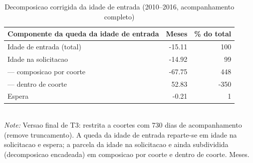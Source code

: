 \begin{table}[htbp]\centering
\caption{Decomposicao corrigida da idade de entrada (2010--2016, acompanhamento completo)}
\label{tab:R4a_final}
\small
\begin{tabular}{lrr}
\toprule
Componente da queda da idade de entrada & Meses & \% do total \\
\midrule
Idade de entrada (total) & -15.11 & 100 \\
\midrule
Idade na solicitacao & -14.92 & 99 \\
\quad --- composicao por coorte & -67.75 & 448 \\
\quad --- dentro de coorte & 52.83 & -350 \\
Espera & -0.21 & 1 \\
\bottomrule
\end{tabular}
\\[3pt]{\footnotesize \textit{Note:} Versao final de T3: restrita a coortes com 730 dias de acompanhamento (remove truncamento). A queda da idade de entrada reparte-se em idade na solicitacao e espera; a parcela da idade na solicitacao e ainda subdividida (decomposicao encadeada) em composicao por coorte e dentro de coorte. Meses.}
\end{table}

